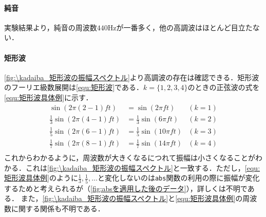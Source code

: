 \paragraph{純音}実験結果より，純音の周波数\(440\textrm{Hz}\)が一番多く，他の高調波はほとんど目立たない．
\paragraph{矩形波}\ref{fig:\kadaiba_矩形波の振幅スペクトル}より高調波の存在は確認できる．矩形波のフーリエ級数展開は\eqref{equ:矩形波}である．\(k=\{1,2,3,4\}\)のときの正弦波の式を\eqref{equ:矩形波具体例}に示す．
\begin{equation}
    \begin{aligned}
        \sin(2\pi(2-1)ft)            & =\sin(2\pi ft)             & (k=1) \\
        \frac{1}{3}\sin(2\pi(4-1)ft) & =\frac{1}{3}\sin(6\pi ft)  & (k=2) \\
        \frac{1}{5}\sin(2\pi(6-1)ft) & =\frac{1}{5}\sin(10\pi ft) & (k=3) \\
        \frac{1}{7}\sin(2\pi(8-1)ft) & =\frac{1}{7}\sin(14\pi ft) & (k=4) \\
    \end{aligned}\label{equ:矩形波具体例}
\end{equation}
これからわかるように，周波数が大きくなるにつれて振幅は小さくなることがわかる．これは\ref{fig:\kadaiba_矩形波の振幅スペクトル}と一致する．ただし，\eqref{equ:矩形波具体例}のように\(\frac{1}{3}, \frac{1}{5},\dots\)と変化しないのは\texttt{abs}関数の利用の際に振幅が変化するためと考えられるが（\ref{fig:absを適用した後のデータ}），詳しくは不明である．
また，\ref{fig:\kadaiba_矩形波の振幅スペクトル}と\eqref{equ:矩形波具体例}の周波数に関する関係も不明である．
